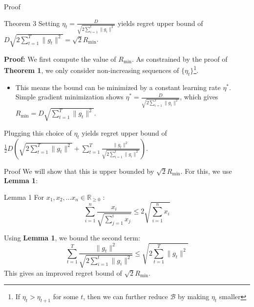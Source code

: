 \documentclass[
	11pt, %
]{beamer}
\begin{document}
\begin{frame}{Proof}
    \begin{block}{Theorem 3}
        Setting $\eta_t = \frac{D}{\sqrt{2 \sum_{i=1}^{t} \|g_i\|^2}}$ yields regret upper bound of $D\sqrt{2 \sum_{t=1}^{T} \|g_t\|^2} = \sqrt{2} R_{\min}$.
    \end{block}
    \textbf{Proof:} We first compute the value of $R_{\min}$. As constrained by the proof of \textbf{Theorem 1}, we only consider non-increasing sequences of $\{\eta_t\}$\footnote{If $\eta_t > \eta_{t+1}$ for some $t$, then we can further reduce $\mathcal{B}$ by making $\eta_t$ smaller}.
    \begin{itemize}
        \item This means the bound can be minimized by a constant learning rate $\eta^*$. Simple gradient minimization shows $\eta^* = \frac{D}{\sqrt{2 \sum_{i=1}^{T} \|g_i\|^2}}$, which gives $R_{\min} = D\sqrt{\sum_{t=1}^{T} \|g_t\|^2}$.
    \end{itemize}
    Plugging this choice of $\eta_t$ yields regret upper bound of $\frac{1}{2} D \left( \sqrt{2 \sum_{t=1}^{T} \|g_t\|^2} + \sum_{t=1}^{T} \frac{\|g_t\|^2}{\sqrt{2 \sum_{i=1}^{t} \|g_i\|^2}} \right)$.
\end{frame}

\begin{frame}{Proof}
    We will show that this is upper bounded by $\sqrt{2}R_{\min}$. For this, we use \textbf{Lemma 1}:
    \begin{block}{Lemma 1}
        For $x_1, x_2, \dots x_n \in \mathbb{R}_{\ge 0}$ :
        $$
        \sum_{i = 1}^{n} \frac{x_i}{\sqrt{\sum_{j=1}^{i} x_j}} \le 2 \sqrt{\sum_{i=1}^{n} x_i}
        $$
    \end{block}
    Using \textbf{Lemma 1}, we bound the second term: 
    $$
    \sum_{t=1}^{T} \frac{\|g_t\|^2}{\sqrt{2 \sum_{i=1}^{t} \|g_i\|^2}} \le \sqrt{2 \sum_{t=1}^{T} \|g_t\|^2}
    $$
    This gives an improved regret bound of $\sqrt{2}R_{\min}$.
\end{frame}


\end{document}
